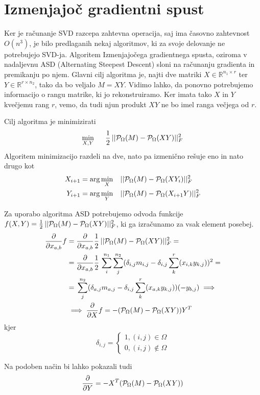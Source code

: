 \section{Izmenjajoč gradientni spust}
Ker je računanje SVD razcepa zahtevna operacija, saj ima časovno zahtevnost
$O(n^3)$, je bilo predlaganih nekaj algoritmov, ki za svoje delovanje ne potrebujejo SVD-ja. Algoritem Izmenjajočega gradientnega spusta, oziroma v nadaljevnu ASD (Alternating Steepest Descent) sloni na računanju gradienta in premikanju po njem. Glavni cilj algoritma je, najti dve matriki $X \in \mathbb{R}^{n_1 \times r}$ ter $Y \in \mathbb{R}^{r \times n_2}$, tako da bo veljalo $M = XY$. Vidimo lahko, da ponovno potrebujemo informacijo o rangu matrike, ki jo rekonstruiramo. Ker imata tako $X$ in $Y$ kvečjemu rang $r$, vemo, da tudi njun produkt $XY$ ne bo imel ranga večjega od $r$. 

Cilj algoritma je minimizirati 
\[
    \min_{X, Y} \hspace{0.5cm} \frac{1}{2}\, ||\mathcal{P}_\Omega(M) - \mathcal{P}_\Omega(XY)||^2_F
\] 
Algoritem minimizacijo razdeli na dve, nato pa izmenično rešuje eno in nato drugo kot 
\begin{align*}
    X_{i+1} &= \arg \min_{X} \hspace{0.3cm} ||\mathcal{P}_\Omega(M) - \mathcal{P}_\Omega(XY_i)||^2_F \\
    Y_{i+1} &= \arg \min_{Y} \hspace{0.3cm} ||\mathcal{P}_\Omega(M) - \mathcal{P}_\Omega(X_{i+1}Y)||^2_F
\end{align*}
\cite{AST-TK15}

Za uporabo algoritma ASD potrebujemo odvoda funkcije $f(X,Y) = \frac{1}{2}\, ||\mathcal{P}_\Omega(M) - \mathcal{P}_\Omega(XY)||^2_F$, ki ga izračunamo za vsak element posebej.
\begin{align*}
    \frac{\partial}{\partial x_{a,b}} f &= \frac{\partial}{\partial x_{a,b}} \frac{1}{2}\, ||\mathcal{P}_\Omega(M) - \mathcal{P}_\Omega(XY)||^2_F = \\
    &= \frac{\partial}{\partial x_{a,b}} \frac{1}{2}\, \sum_{i}^{n_1}\sum_{j}^{n_2}(\delta_{i,j}m_{i,j} - \delta_{i,j}\sum_{k}^{r}(x_{i,k}y_{k,j}))^2 = \\
    &= \, \sum_{j}^{n_2}(\delta_{a,j}m_{a,j} - \delta_{i,j}\sum_{k}^{r}(x_{a,k}y_{k,j}))(-y_{b,j}) \implies \\
    &\implies \frac{\partial}{\partial X}f = -(\mathcal{P}_\Omega(M) - \mathcal{P}_\Omega(XY))Y^T
\end{align*}
kjer 
\[
    \delta_{i,j} = \begin{cases}
        1, (i, j) \in \Omega \\
        0, (i, j) \notin \Omega
    \end{cases}
\]

Na podoben način bi lahko pokazali tudi
\[
    \frac{\partial}{\partial Y} = -X^T (\mathcal{P}_\Omega(M) - \mathcal{P}_\Omega(XY))
\]

